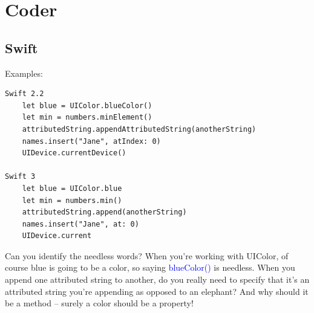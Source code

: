 \documentclass[12pt,a4paper]{article}
\begin{document}
{{	\section{Coder}
	\subsection{Swift}
	\label{swift}
	Examples:
\begin{lstlisting}
Swift 2.2
	let blue = UIColor.blueColor()
	let min = numbers.minElement()
	attributedString.appendAttributedString(anotherString)
	names.insert("Jane", atIndex: 0)
	UIDevice.currentDevice()
	
Swift 3
	let blue = UIColor.blue
	let min = numbers.min()
	attributedString.append(anotherString)
	names.insert("Jane", at: 0)
	UIDevice.current
\end{lstlisting}
	Can you identify the needless words? When you're working with UIColor, of course blue is going to be a color, so saying {\textcolor{blue} {blueColor()}} is needless. When you append one attributed string to another, do you really need to specify that it's an attributed string you're appending as opposed to an elephant? And why should it be a method – surely a color should be a property!
	\newpage
}}
\end{document}
